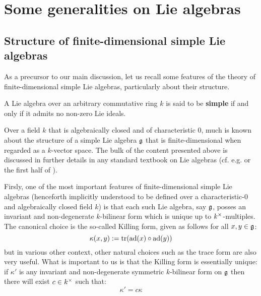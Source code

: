 \section{Some generalities on Lie algebras}
    \subsection{Structure of finite-dimensional simple Lie algebras}
        As a precursor to our main discussion, let us recall some features of the theory of finite-dimensional simple Lie algebras, particularly about their structure.

        \begin{definition}
            A Lie algebra over an arbitrary commutative ring $k$ is said to be \textbf{simple} if and only if it admits no non-zero Lie ideals. 
        \end{definition}

        Over a field $k$ that is algebraically closed and of characteristic $0$, much is known about the structure of a simple Lie algebra $\mathfrak{g}$ that is finite-dimensional when regarded as a $k$-vector space. The bulk of the content presented above is discussed in further details in any standard textbook on Lie algebras (cf. e.g. \cite{humphreys_lie_algebras} or the first half of \cite{carter_affine_lie_algebras}). 

        Firsly, one of the most important features of finite-dimensional simple Lie algebras (henceforth implicitly understood to be defined over a characteristic-$0$ and algebraically closed field $k$) is that each such Lie algebra, say $\mathfrak{g}$, posses an invariant and non-degenerate $k$-bilinear form which is unique up to $k^{\x}$-multiples. The canonical choice is the so-called Killing form, given as follows for all $x, y \in \mathfrak{g}$:
            $$\kappa(x, y) := \operatorname{tr}(\mathrm{ad}(x) \circ \mathrm{ad}(y))$$
        but in various other context, other natural choices such as the trace form are also very useful. What is important to us is that the Killing form is essentially unique: if $\kappa'$ is any invariant and non-degenerate symmetric $k$-bilinear form on $\mathfrak{g}$ then there will exist $c \in k^{\x}$ such that:
            $$\kappa' = c \kappa$$

